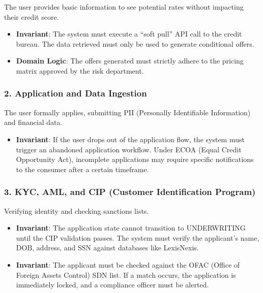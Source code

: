 The user provides basic information to see potential rates without
impacting their credit score.

\begin{itemize}
\tightlist
\item
  \textbf{Invariant}: The system must execute a ``soft pull'' API call
  to the credit bureau. The data retrieved must only be used to generate
  conditional offers.
\item
  \textbf{Domain Logic}: The offers generated must strictly adhere to
  the pricing matrix approved by the risk department.
\end{itemize}

\subsubsection{2. Application and Data
Ingestion}\label{application-and-data-ingestion}

The user formally applies, submitting PII (Personally Identifiable
Information) and financial data.

\begin{itemize}
\tightlist
\item
  \textbf{Invariant}: If the user drops out of the application flow, the
  system must trigger an abandoned application workflow. Under ECOA
  (Equal Credit Opportunity Act), incomplete applications may require
  specific notifications to the consumer after a certain timeframe.
\end{itemize}

\subsubsection{3. KYC, AML, and CIP (Customer Identification
Program)}\label{kyc-aml-and-cip-customer-identification-program}

Verifying identity and checking sanctions lists.

\begin{itemize}
\tightlist
\item
  \textbf{Invariant}: The application state cannot transition to
  UNDERWRITING until the CIP validation passes. The system must verify
  the applicant's name, DOB, address, and SSN against databases like
  LexisNexis.
\item
  \textbf{Invariant}: The applicant must be checked against the OFAC
  (Office of Foreign Assets Control) SDN list. If a match occurs, the
  application is immediately locked, and a compliance officer must be
  alerted.
\end{itemize}


